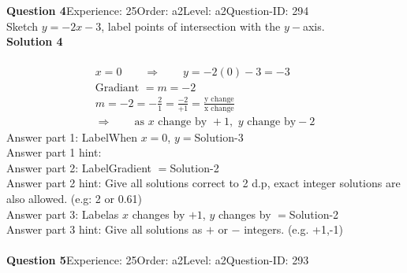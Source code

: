 \documentclass{article}
\begin{document}
\noindent\textbf{Question 4}\hspace{20pt}Experience: 25\hspace{20pt}Order: a2\hspace{20pt}Level: a2\hspace{20pt}Question-ID: 294\\[2pt]
Sketch $y=-2x-3$, label points of intersection with the $y-$axis.\\[4pt]
\noindent\textbf{Solution 4}\\[2pt]
\\[-35pt]\begin{align*}
&x=0\qquad\Rightarrow\qquad y=-2(0)-3=-3&\\[2pt]
&\text{Gradiant}\,\,=m=-2&\\[2pt]
&m=-2=-\displaystyle\frac{2}{1}=\displaystyle\frac{-2}{+1}=\displaystyle\frac{\text{y change}}{\text{x change}}&\\[2pt]
& \Rightarrow\qquad \text{as}\,\, x \,\,\text{change by } +1,\,\, y\,\, \text{change by} -2 &
\end{align*}
Answer part 1: \hspace{10pt}Label\hspace{10pt}When $x=0$, $y=$\hspace{10pt}Solution\hspace{10pt}-3\\
Answer part 1 hint: \hspace{15pt}\\
Answer part 2: \hspace{10pt}Label\hspace{10pt}Gradient $=$\hspace{10pt}Solution\hspace{10pt}-2\\
Answer part 2 hint: \hspace{15pt}Give all solutions correct to 2 d.p, exact integer solutions are also allowed. (e.g: 2 or 0.61)\\
Answer part 3: \hspace{10pt}Label\hspace{10pt}as $x$ changes by $+1$, $y$ changes by $=$\hspace{10pt}Solution\hspace{10pt}-2\\
Answer part 3 hint: \hspace{15pt}Give all solutions as $+$ or $-$ integers. (e.g. +1,-1)\\
\\[4pt]
\noindent\textbf{Question 5}\hspace{20pt}Experience: 25\hspace{20pt}Order: a2\hspace{20pt}Level: a2\hspace{20pt}Question-ID: 293\\[2pt]
\end{document}
